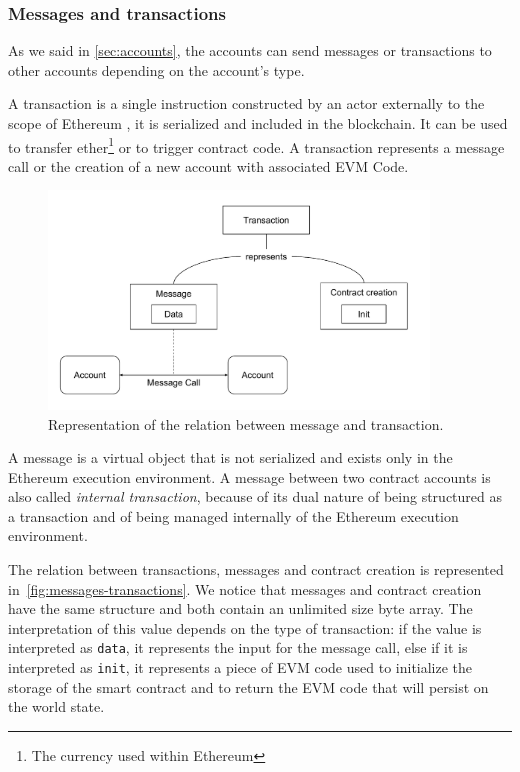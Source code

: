 \subsubsection{Messages and transactions}

As we said in \autoref{sec:accounts}, the accounts can send messages or
transactions to other accounts depending on the account's type.

A transaction is a single instruction constructed by an actor externally to the
scope of Ethereum \cite{wood2018ethereum}, it is serialized and included in the
blockchain. It can be used to transfer ether\footnote{The currency used within
Ethereum} or to trigger contract code. A transaction represents a message call
or the creation of a new account with associated EVM Code.

\begin{figure}[h]
  \centering
  \includegraphics[width=0.9\textwidth]{./res/img/messages-transactions.pdf}
\caption{Representation of the relation between message and transaction.}
\label{fig:messages-transactions}
\end{figure}

A message is a virtual object that is not serialized and exists only in the
Ethereum execution environment. A message between two contract accounts is also
called \emph{internal transaction}, because of its dual nature of being
structured as a transaction and of being managed internally of the Ethereum
execution environment.

The relation between transactions, messages and contract creation is represented
in~\autoref{fig:messages-transactions}. We notice that messages and contract
creation have the same structure and both contain an unlimited size byte array.
The interpretation of this value depends on the type of transaction: if the
value is interpreted as \verb+data+, it represents the input for the message
call, else if it is interpreted as \verb|init|, it represents a piece of EVM
code used to initialize the storage of the smart contract and to return the EVM
code that will persist on the world state.


